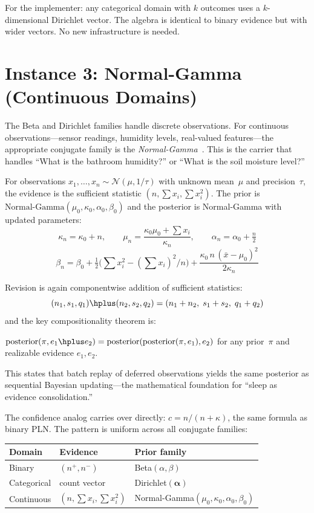 \documentclass[11pt,openany]{report}
\begin{document}
For the implementer: any categorical domain with $k$ outcomes uses
a $k$-dimensional Dirichlet vector.  The algebra is identical to
binary evidence but with wider vectors.  No new infrastructure is
needed.

\section{Instance 3: Normal-Gamma (Continuous Domains)}
\label{sec:normal-gamma}

The Beta and Dirichlet families handle discrete observations.  For
continuous observations---sensor readings, humidity levels, real-valued
features---the appropriate conjugate family is the
\emph{Normal-Gamma}~\cite{BernardoSmith2000}.  This is the carrier
that handles ``What is the bathroom humidity?'' or ``What is the soil
moisture level?''

For observations $x_1, \ldots, x_n \sim \mathcal{N}(\mu, 1/\tau)$
with unknown mean~$\mu$ and precision~$\tau$, the evidence is the
sufficient statistic $(n, \textstyle\sum x_i, \sum x_i^2)$.  The prior
is $\text{Normal-Gamma}(\mu_0, \kappa_0, \alpha_0, \beta_0)$ and the
posterior is Normal-Gamma with updated parameters:
\[
  \kappa_n = \kappa_0 + n, \qquad
  \mu_n = \frac{\kappa_0 \mu_0 + \sum x_i}{\kappa_n}, \qquad
  \alpha_n = \alpha_0 + \tfrac{n}{2}
\]
\[
  \beta_n = \beta_0
    + \tfrac{1}{2}\bigl(\textstyle\sum x_i^2 - (\sum x_i)^2/n\bigr)
    + \frac{\kappa_0 \, n \, (\bar{x} - \mu_0)^2}{2\kappa_n}
\]

Revision is again componentwise addition of sufficient statistics:
\[
  (n_1, s_1, q_1) \hplus (n_2, s_2, q_2) = (n_1 + n_2,\; s_1 + s_2,\; q_1 + q_2)
\]
and the key compositionality theorem is:
\begin{theorem}
\label{thm:sleep-consolidation}
  $\text{posterior}(\pi, e_1 \hplus e_2)
   = \text{posterior}(\text{posterior}(\pi, e_1), e_2)$
  for any prior~$\pi$ and realizable evidence $e_1, e_2$.
\end{theorem}
This states that batch replay of deferred observations yields the same
posterior as sequential Bayesian updating---the mathematical foundation
for ``sleep as evidence consolidation.''

The confidence analog carries over directly: $c = n/(n + \kappa)$,
the same formula as binary PLN.  The pattern is uniform across all
conjugate families:

\medskip
\begin{center}
\begin{tabular}{lll}
  \textbf{Domain} & \textbf{Evidence} & \textbf{Prior family} \\
  \hline
  Binary  & $(n^+, n^-)$ & Beta$(\alpha, \beta)$ \\
  Categorical & count vector & Dirichlet$(\boldsymbol\alpha)$ \\
  Continuous  & $(n, \sum x_i, \sum x_i^2)$ & Normal-Gamma$(\mu_0, \kappa_0, \alpha_0, \beta_0)$
\end{tabular}
\end{center}
\medskip
\end{document}
